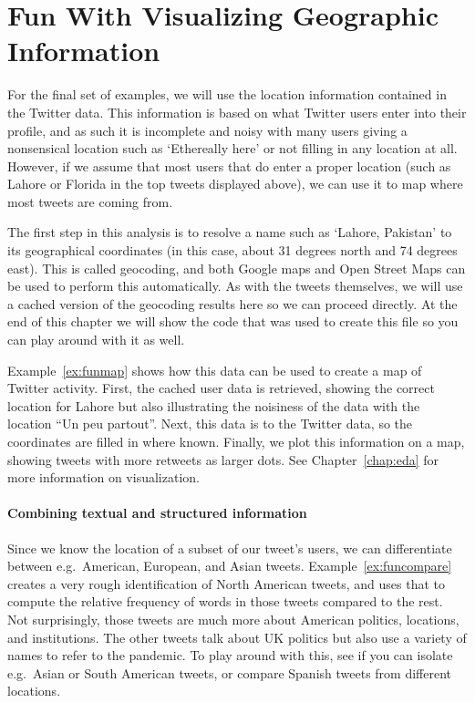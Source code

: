 
\section{Fun With Visualizing Geographic Information}
For the final set of examples, we will use the location information contained in the Twitter data.
This information is based on what Twitter users enter into their profile, and as such it is incomplete and noisy
with many users giving a nonsensical location such as `Ethereally here' or not filling in any location at all.
However, if we assume that most users that do enter a proper location (such as Lahore or Florida in the top tweets displayed above),
we can use it to map where most tweets are coming from.

The first step in this analysis is to resolve a name such as `Lahore, Pakistan' to its geographical coordinates (in this case, about 31 degrees north and 74 degrees east). This is called geocoding, and both Google maps and Open Street Maps can be used
to perform this automatically.
As with the tweets themselves, we will use a cached version of the geocoding results here so we can proceed directly.
At the end of this chapter we will show the code that was used to create this file so you can play around with it as well. 

Example~\ref{ex:funmap} shows how this data can be used to create a map of Twitter activity.
First, the cached user data is retrieved, showing the correct location for Lahore but also
illustrating the noisiness of the data with the location ``Un peu partout''.
Next, this data is  to the Twitter data, so the coordinates are filled in where known.
Finally, we plot this information on a map, showing tweets with more retweets as larger dots.
See Chapter~\ref{chap:eda} for more information on visualization.



\paragraph{Combining textual and structured information}
Since we know the location of a subset of our tweet's users,
we can differentiate between e.g.\ American, European, and Asian tweets.
Example~\ref{ex:funcompare} creates a very rough identification of North American tweets,
and uses that to compute the relative frequency of words in those tweets compared to the rest.
Not surprisingly, those tweets are much more about American politics, locations, and institutions.
The other tweets talk about UK politics but also use a variety of names to refer to the pandemic.
To play around with this, see if you can isolate e.g.\ Asian or South American tweets,
or compare Spanish tweets from different locations.


